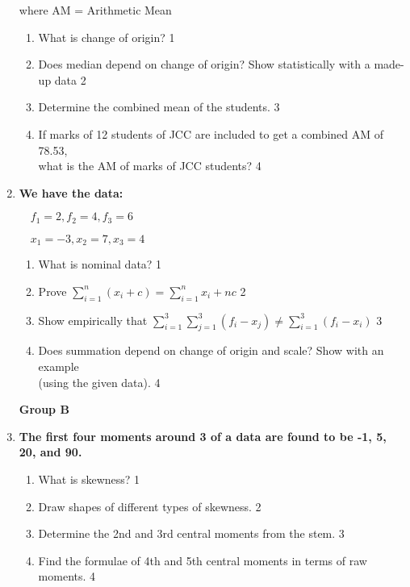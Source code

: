 \documentclass{article}
\begin{document}
\begin{enumerate}
where AM = Arithmetic Mean

  \begin{enumerate}
    \item
	What is change of origin? \hfill 1
    \item
	Does median depend on change of origin? Show statistically with a made-up data \hfill 2
    \item  
	Determine the combined mean of the students. \hfill 3
    \item
	If marks of 12 students of JCC are included to get a combined AM of 78.53, \\ what is the AM of marks of JCC students? \hfill 4
\end{enumerate}

  \item
	  \textbf{We have the data:}
	
	$\quad f_1=2, f_2 = 4, f_3 = 6$

	$\quad x_1 = -3, x_2 =7, x_3 = 4$

  \begin{enumerate}
    \item
	What is nominal data? \hfill 1
    \item
	Prove $\displaystyle \sum_{i=1}^{n} (x_i+c)=\sum_{i=1}^{n} x_i + nc$ \hfill 2
    \item  
	Show empirically that $\displaystyle \sum_{i=1}^{3} \sum_{j=1}^{3}(f_i-x_j) \ne \sum_{i=1}^{3} (f_i-x_i)$ \hfill 3
    \item
	Does summation depend on change of origin and scale? Show with an example\\ (using the given data).  \hfill 4
\end{enumerate}

\begin{center}
\textbf{Group B}
\end{center}

 \item
	  \textbf{The first four moments around 3 of a data are found to be -1, 5, 20, and 90.  }
  \begin{enumerate}
    \item
	What is skewness? \hfill 1
    \item
	Draw shapes of different types of skewness. \hfill 2
    \item  
	Determine the 2nd and 3rd central moments from the stem. \hfill 3
    \item
	Find the formulae of 4th and 5th central moments in terms of raw moments. \hfill 4
\end{enumerate}


\end{enumerate}
\end{document}
